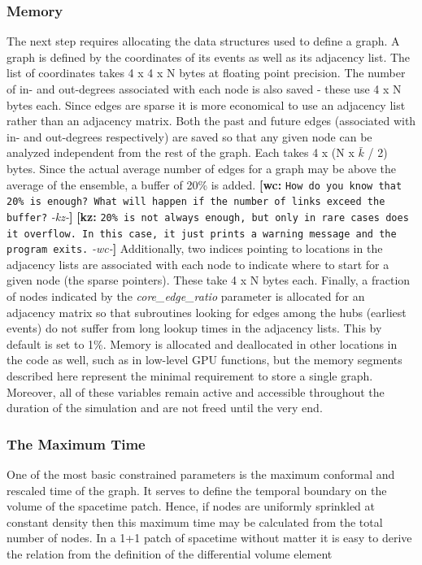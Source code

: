 \documentclass[preprint,notitlepage,amsmath,amssymb,floatfix]{revtex4-1}
\newcommand{\XXX}[3]{{\bf [#1: } {\tt #3} {\it -#2-}{\bf ]}}
\begin{document}
\subsubsection{Memory}
The next step requires allocating the data structures used to define a graph.  
A graph is defined by the coordinates of its events as well as its adjacency list.  
The list of coordinates takes 4 x 4 x N bytes at floating point precision.
The number of in- and out-degrees associated with each node is also saved - these use 4 x N bytes each.
Since edges are sparse it is more economical to use an adjacency list rather than an adjacency matrix.
Both the past and future edges (associated with in- and out-degrees respectively) are saved so that any given node can be analyzed independent from the rest of the graph.  
Each takes 4 x (N x $\bar k$ / 2) bytes.  
Since the actual average number of edges for a graph may be above the average of the ensemble, a buffer of 20\% is added. \XXX{wc}{kz}{How do you know that 20\% is enough? What will happen if the number of links exceed the buffer?} \XXX{kz}{wc}{20\% is not always enough, but only in rare cases does it overflow.  In this case, it just prints a warning message and the program exits.}
Additionally, two indices pointing to locations in the adjacency lists are associated with each node to indicate where to start for a given node (the sparse pointers).
These take 4 x N bytes each.
Finally, a fraction of nodes indicated by the \textit{core\_edge\_ratio} parameter is allocated for an adjacency matrix so that subroutines looking for edges among the hubs (earliest events) do not suffer from long lookup times in the adjacency lists.  
This by default is set to 1\%.
Memory is allocated and deallocated in other locations in the code as well, such as in low-level GPU functions, but the memory segments described here represent the minimal requirement to store a single graph.
Moreover, all of these variables remain active and accessible throughout the duration of the simulation and are not freed until the very end.
\subsubsection{The Maximum Time}
One of the most basic constrained parameters is the maximum conformal and rescaled time of the graph.
It serves to define the temporal boundary on the volume of the spacetime patch.  
Hence, if nodes are uniformly sprinkled at constant density then this maximum time may be calculated from the total number of nodes.
In a 1+1 patch of spacetime without matter it is easy to derive the relation from the definition of the differential volume element
\end{document}
